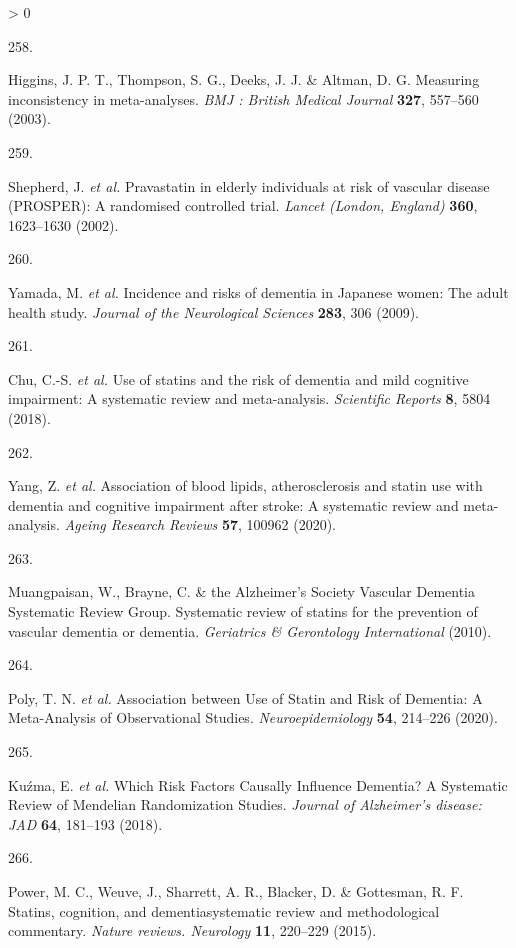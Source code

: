 \documentclass[a4paper, twoside]{templates/ociamthesis}
\newlength{\cslhangindent}
\newlength{\csllabelwidth}
\newenvironment{CSLReferences}[3] %
 {%
  \setlength{\parindent}{0pt}
  \ifodd #1 \everypar{\setlength{\hangindent}{\cslhangindent}}\ignorespaces\fi
  \ifnum #2 > 0
  \setlength{\parskip}{#2\baselineskip}
  \fi
 }%
 {}
\newcommand{\CSLLeftMargin}[1]{\parbox[t]{\maxof{\widthof{#1}}{\csllabelwidth}}{#1}}
\newcommand{\CSLRightInline}[1]{\parbox[t]{\linewidth - \csllabelwidth}{#1}}
\begin{document}
\begin{CSLReferences}{0}{0}
\leavevmode\hypertarget{ref-higgins2003}{}%
\CSLLeftMargin{258. }
\CSLRightInline{Higgins, J. P. T., Thompson, S. G., Deeks, J. J. \& Altman, D. G. Measuring inconsistency in meta-analyses. \emph{BMJ : British Medical Journal} \textbf{327}, 557--560 (2003).}

\leavevmode\hypertarget{ref-shepherd2002}{}%
\CSLLeftMargin{259. }
\CSLRightInline{Shepherd, J. \emph{et al.} Pravastatin in elderly individuals at risk of vascular disease ({PROSPER}): A randomised controlled trial. \emph{Lancet (London, England)} \textbf{360}, 1623--1630 (2002).}

\leavevmode\hypertarget{ref-yamada2009conf}{}%
\CSLLeftMargin{260. }
\CSLRightInline{Yamada, M. \emph{et al.} Incidence and risks of dementia in {Japanese} women: The adult health study. \emph{Journal of the Neurological Sciences} \textbf{283}, 306 (2009).}

\leavevmode\hypertarget{ref-chu2018}{}%
\CSLLeftMargin{261. }
\CSLRightInline{Chu, C.-S. \emph{et al.} Use of statins and the risk of dementia and mild cognitive impairment: A systematic review and meta-analysis. \emph{Scientific Reports} \textbf{8}, 5804 (2018).}

\leavevmode\hypertarget{ref-yang2020}{}%
\CSLLeftMargin{262. }
\CSLRightInline{Yang, Z. \emph{et al.} Association of blood lipids, atherosclerosis and statin use with dementia and cognitive impairment after stroke: A systematic review and meta-analysis. \emph{Ageing Research Reviews} \textbf{57}, 100962 (2020).}

\leavevmode\hypertarget{ref-muangpaisan2010}{}%
\CSLLeftMargin{263. }
\CSLRightInline{Muangpaisan, W., Brayne, C. \& the Alzheimer's Society Vascular Dementia Systematic Review Group. Systematic review of statins for the prevention of vascular dementia or dementia. \emph{Geriatrics \& Gerontology International} (2010).}

\leavevmode\hypertarget{ref-poly2020}{}%
\CSLLeftMargin{264. }
\CSLRightInline{Poly, T. N. \emph{et al.} Association between {Use} of {Statin} and {Risk} of {Dementia}: A {Meta}-{Analysis} of {Observational Studies}. \emph{Neuroepidemiology} \textbf{54}, 214--226 (2020).}

\leavevmode\hypertarget{ref-kuzma2018risk}{}%
\CSLLeftMargin{265. }
\CSLRightInline{Kuźma, E. \emph{et al.} Which {Risk Factors Causally Influence Dementia}? A {Systematic Review} of {Mendelian Randomization Studies}. \emph{Journal of Alzheimer's disease: JAD} \textbf{64}, 181--193 (2018).}

\leavevmode\hypertarget{ref-power2015}{}%
\CSLLeftMargin{266. }
\CSLRightInline{Power, M. C., Weuve, J., Sharrett, A. R., Blacker, D. \& Gottesman, R. F. Statins, cognition, and dementia{}systematic review and methodological commentary. \emph{Nature reviews. Neurology} \textbf{11}, 220--229 (2015).}


\end{CSLReferences}
\end{document}
